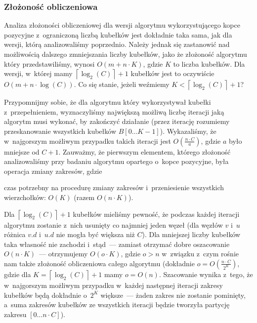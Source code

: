 \subsubsection{Złożoność obliczeniowa}


Analiza złożoności obliczeniowej dla wersji algorytmu wykorzystującego kopce pozycyjne z~ograniczoną liczbą kubełków jest dokładnie taka sama, jak dla wersji, którą analizowaliśmy poprzednio.
Należy jednak się zastanowić nad możliwością dalszego zmniejszania liczby kubełków, jako że złożoność algorytmu który przedstawiliśmy, wynosi $O \left( m + n \cdot K \right)$, gdzie $K$ to liczba kubełków.
Dla wersji, w~której mamy $\left \lceil \log_{2} \left( C \right) \right \rceil + 1$ kubełków jest to oczywiście $O \left( m + n \cdot \log \left( C \right) \right)$.
Co się stanie, jeżeli weźmiemy $K < \left \lceil \log_{2} \left( C \right) \right \rceil + 1$?

Przypomnijmy sobie, że dla algorytmu który wykorzystywał kubełki z~przepełnieniem, wyznaczyliśmy największą możliwą liczbę iteracji jaką algorytm musi wykonać, by zakończyć działanie (przez iterację rozumiemy przeskanowanie wszystkich kubełków $B \left[ 0 \dots K - 1\right]$).
Wykazaliśmy, że w~najgorszym możliwym przypadku takich iteracji jest $O \left( \frac{n \cdot C}{a} \right)$, gdzie $a$ było mniejsze od $C + 1$.
Zauważmy, że pierwszym elementem, którego złożoność analizowaliśmy przy badaniu algorytmu opartego o~kopce pozycyjne, była operacja zmiany zakresów, gdzie

\begin{myitemize}
	\item czas potrzebny na procedurę zmiany zakresów i~przeniesienie wszystkich wierzchołków: $O \left( K \right)$ (razem $O \left( n \cdot K \right)$).
\end{myitemize}

Dla $\left \lceil \log_{2} \left( C \right) \right \rceil + 1$ kubełków mieliśmy pewność, że podczas każdej iteracji algorytmu zostanie z~nich usunięty co najmniej jeden węzeł (dla węzłów $v$ i~$u$ różnica $v.d$ i~$u.d$ nie mogła być większa niż $C$).
Dla mniejszej liczby kubełków taka własność nie zachodzi i~stąd~--- zamiast otrzymać dobre oszacowanie $O \left( n \cdot K \right)$~--- otrzymujemy $O \left( o \cdot K \right)$, gdzie $o > n$ w~związku z~czym rośnie nam także złożoność obliczeniowa całego algorytmu (dokładnie $o = O \left( \frac{n \cdot C}{2^{K}}\right)$, gdzie dla $K = \left \lceil \log_{2} \left( C \right) \right \rceil + 1$ mamy $o = O \left( n \right)$.
Szacowanie wynika z~tego, że w~najgorszym możliwym przypadku w~każdej następnej iteracji zakresy kubełków będą dokładnie o~$2^{K}$ większe~--- żaden zakres nie zostanie pominięty, a~suma zakresów kubełków ze wszystkich iteracji będzie tworzyła partycję zakresu $\left[ 0 \dots n \cdot C \right]$).

